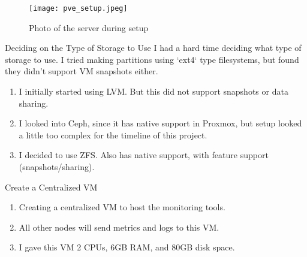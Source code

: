 \documentclass[14pt,compress,usenames,dvipsnames,aspectratio=169]{beamer}
\begin{document}
\begin{frame}{}
    \begin{figure}
        \centering
        \texttt{[image: pve\_setup.jpeg]}
        \caption{Photo of the server during setup}
        \label{fig:setup-pic}
    \end{figure}
\end{frame}

\begin{frame}{Deciding on the Type of Storage to Use}
    I had a hard time deciding what type of storage to use. 
        I tried making partitions using `ext4` type filesystems, but found they didn't support VM snapshots either.
    \begin{enumerate}
        \item{I initially started using LVM. But this did not support snapshots or
            data sharing.}
        \item{I looked into Ceph, since it has native support in Proxmox, but setup
            looked a little too complex for the timeline of this project.}
        \item{I decided to use ZFS. Also has native support, with feature support 
            (snapshots/sharing).}
    \end{enumerate}
\end{frame}



\begin{frame}{Create a Centralized VM}
    \begin{enumerate}
        \item{Creating a centralized VM to host the monitoring tools.} 
        \item{All other nodes will send metrics and logs to this VM.}
        \item{I gave this VM 2 CPUs, 6GB RAM, and 80GB disk space.}
    \end{enumerate}
\end{frame}
\end{document}
